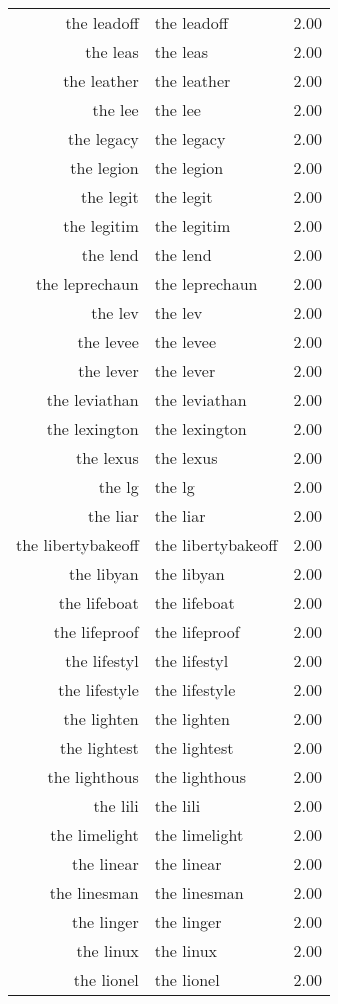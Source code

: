 \begin{table}[ht]
\begin{tabular}{rlr}
  the leadoff & the leadoff & 2.00 \\ 
  the leas & the leas & 2.00 \\ 
  the leather & the leather & 2.00 \\ 
  the lee & the lee & 2.00 \\ 
  the legacy & the legacy & 2.00 \\ 
  the legion & the legion & 2.00 \\ 
  the legit & the legit & 2.00 \\ 
  the legitim & the legitim & 2.00 \\ 
  the lend & the lend & 2.00 \\ 
  the leprechaun & the leprechaun & 2.00 \\ 
  the lev & the lev & 2.00 \\ 
  the levee & the levee & 2.00 \\ 
  the lever & the lever & 2.00 \\ 
  the leviathan & the leviathan & 2.00 \\ 
  the lexington & the lexington & 2.00 \\ 
  the lexus & the lexus & 2.00 \\ 
  the lg & the lg & 2.00 \\ 
  the liar & the liar & 2.00 \\ 
  the libertybakeoff & the libertybakeoff & 2.00 \\ 
  the libyan & the libyan & 2.00 \\ 
  the lifeboat & the lifeboat & 2.00 \\ 
  the lifeproof & the lifeproof & 2.00 \\ 
  the lifestyl & the lifestyl & 2.00 \\ 
  the lifestyle & the lifestyle & 2.00 \\ 
  the lighten & the lighten & 2.00 \\ 
  the lightest & the lightest & 2.00 \\ 
  the lighthous & the lighthous & 2.00 \\ 
  the lili & the lili & 2.00 \\ 
  the limelight & the limelight & 2.00 \\ 
  the linear & the linear & 2.00 \\ 
  the linesman & the linesman & 2.00 \\ 
  the linger & the linger & 2.00 \\ 
  the linux & the linux & 2.00 \\ 
  the lionel & the lionel & 2.00 \\ 

\end{tabular}
\end{table}

